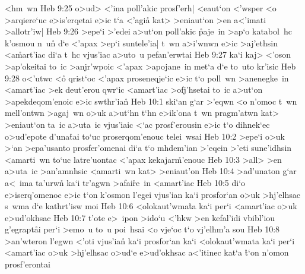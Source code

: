 <hm~wn\bibvsend
\vs Heb 9:25
o>ud>
<'ina
poll'akic
prosf'erh|
<eaut`on
<'wsper
<o
>arqiere`uc
e>is'erqetai
e>ic
t`a
<'agi\r{a}
kat>
>eniaut`on
>en
a<'imati
>allotr'iw|\bibvsend
\vs Heb 9:26
>epe`i
>'edei
a>ut`on
poll'akic
\r{p}aje~in
>ap`o
katabol~hc
k'osmou
n~u\r{n}
d`e
<'apax
>ep`i
suntele'ia|
t~wn
a>i'wnwn
e>ic
>aj'ethsin
<a\r{m}art'iac
di`a
t~hc
vjus'iac
a>uto~u
pefan'erwtai\bibvsend
\vs Heb 9:27
ka`i
kaj>
<'oson
>ap'okeitai
to~ic
>anjr'wpoic
<'apax
>apojane~in
met`a
d`e
to~uto
kr'isic\bibvsend
\vs Heb 9:28
o<'utwc
<o\r{}
qrist`oc
<'apax
proseneqje`ic
e>ic
t`o
poll~wn
>anenegke~in
<amart'iac
>ek
deut'erou
qwr`ic
<amart'iac
>ofj'hsetai
to~ic
a>ut`on
>apekdeqom'enoic
e>ic
swthr'ia\r{n}\bibvsend
{}
\vs Heb 10:1
ski`an
g`ar
>'eqwn
<o
n'omoc
t~wn
mell'ontwn
>agaj~wn
o>uk
a>ut`hn
t`hn
e>ik'ona
t~wn
pragm'atwn
kat>
>eniaut`on
ta~ic
a>uta~ic
vjus'iaic
<`ac
prosf'erousin
e>ic
t`o
dihnek`ec
o>ud'epote
d'una\r{t}ai
to`uc
proserqom'enouc
telei~wsai\bibvsend
\vs Heb 10:2
>epe`i
o>uk
>`an
>epa'usanto
prosfer'omenai
di`a
t`o
mhdem'ian
>'eqein
>'eti
sune'idhsin
<amarti~wn
to`uc
latre'uontac
<'apax
kekajar\r{m}'enouc\bibvsend
{}
\vs Heb 10:3
>all>
>en
a>uta~ic
>an'amnhsic
<amarti~wn
kat>
>eniaut'on\bibvsend
\vs Heb 10:4
>ad'unaton
g`ar
a<~ima
ta'urwn\r{}
ka`i
tr'agwn
>afai\r{r}e~in
<amart'iac\bibvsend
\vs Heb 10:5
di`o
e>iserq'omenoc
e>ic
t`on
k'osmon
l'egei
vjus'ian
ka`i
prosfor`an
o>uk
>hj'elhsac
s~wma
d`e
kathrt'isw
moi\bibvsend
\vs Heb 10:6
<olokaut'wma\r{t}a
ka`i
per`i
<amart'iac
o>uk
e>ud'okhsac\bibvsend
\vs Heb 10:7
t'ote
e>~ipon
>ido`u
<'hkw
>en
kefal'idi
vbibl'iou
g'egrapt\r{a}i
per`i
>emo~u
to~u
poi~hsai
<o
vje`oc
t`o
vj'elhm'a
sou\bibvsend
\vs Heb 10:8
>an'wteron
l'egwn
<'oti
vjus'ian\r{}
ka`i
prosfor`an
ka`i
<olokaut'wmata
ka`i
per`i
<amart'iac
o>uk
>hj'elhsac
o>ud`e
e>ud'okhsac
a<'itinec
kat`a
\r{t}`on
n'omon
prosf'erontai\bibvsend
